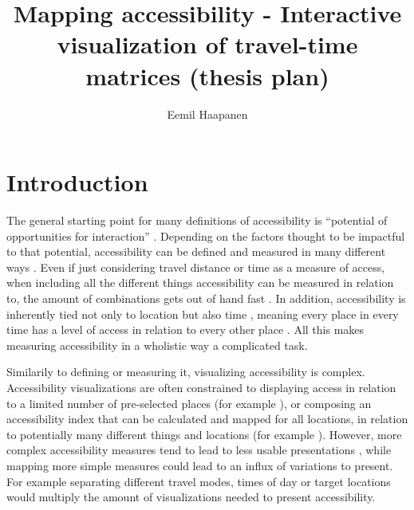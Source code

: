 \documentclass{article}
\title{Mapping accessibility - Interactive visualization of travel-time matrices (thesis plan)}
\author{Eemil Haapanen}
\begin{document}
\maketitle

\section{Introduction}
The general starting point for many definitions of accessibility is
\enquote{potential of opportunities for interaction} \parencite{han1959}.
Depending on the factors thought to be impactful to that potential,
accessibility can be defined and measured in many different ways \parencite{pap2016}.
Even if just considering travel distance or time as a measure of access,
when including all the different things accessibility can be measured in relation to,
the amount of combinations gets out of hand fast \parencite{lev2020}.
In addition, accessibility is inherently tied not only to location
but also time \parencite{jar2018},
meaning every place in every time has a level of access
in relation to every other place \parencite{lev2020}.
All this makes measuring accessibility in a wholistic way a complicated task.

Similarily to defining or measuring it, visualizing accessibility is complex.
Accessibility visualizations are often constrained to displaying access in relation to
a limited number of pre-selected places (for example \textcite{wei2018}),
or composing an accessibility index that can be calculated and mapped for all locations,
in relation to potentially many different things and locations (for example \textcite{kim2019}).
However, more complex accessibility measures tend to lead to
less usable presentations \parencite{te2014},
while mapping more simple measures could lead to an influx of variations to present.
For example separating different travel modes, times of day or target locations
would multiply the amount of visualizations needed to present accessibility.
\end{document}
